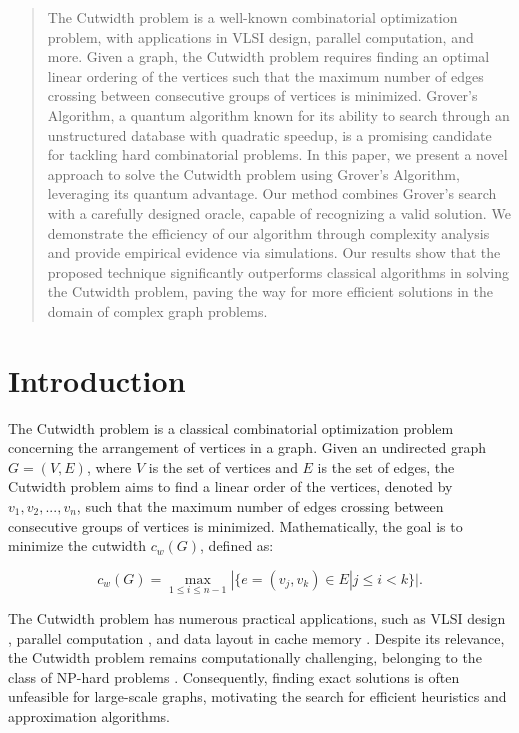 \begin{abstract}
The Cutwidth problem is a well-known combinatorial optimization problem, with applications in VLSI design, parallel computation, and more. Given a graph, the Cutwidth problem requires finding an optimal linear ordering of the vertices such that the maximum number of edges crossing between consecutive groups of vertices is minimized. Grover's Algorithm, a quantum algorithm known for its ability to search through an unstructured database with quadratic speedup, is a promising candidate for tackling hard combinatorial problems. In this paper, we present a novel approach to solve the Cutwidth problem using Grover's Algorithm, leveraging its quantum advantage. Our method combines Grover's search with a carefully designed oracle, capable of recognizing a valid solution. We demonstrate the efficiency of our algorithm through complexity analysis and provide empirical evidence via simulations. Our results show that the proposed technique significantly outperforms classical algorithms in solving the Cutwidth problem, paving the way for more efficient solutions in the domain of complex graph problems.
\end{abstract}

\section{Introduction}

The Cutwidth problem is a classical combinatorial optimization problem concerning the arrangement of vertices in a graph. Given an undirected graph $G = (V, E)$, where $V$ is the set of vertices and $E$ is the set of edges, the Cutwidth problem aims to find a linear order of the vertices, denoted by $v_1, v_2, ..., v_n$, such that the maximum number of edges crossing between consecutive groups of vertices is minimized. Mathematically, the goal is to minimize the cutwidth $c_w(G)$, defined as:

\begin{equation}
c_w(G) = \max_{1 \leq i \leq n-1} |\{e=(v_j, v_k) \in E | j \leq i < k\}|.
\end{equation}

The Cutwidth problem has numerous practical applications, such as VLSI design \cite{vlsi}, parallel computation \cite{parallel}, and data layout in cache memory \cite{cache}. Despite its relevance, the Cutwidth problem remains computationally challenging, belonging to the class of NP-hard problems \cite{nphard}. Consequently, finding exact solutions is often unfeasible for large-scale graphs, motivating the search for efficient heuristics and approximation algorithms.

